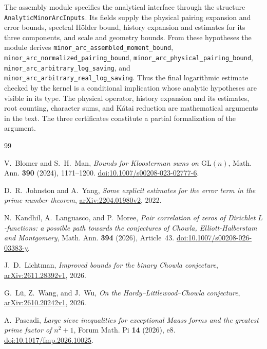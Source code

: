\documentclass[11pt]{amsart}
\numberwithin{equation}{section}
\theoremstyle{remark}
\begin{document}
The assembly module specifies the analytical interface through the
structure \texttt{AnalyticMinorArcInputs}. Its fields supply the
physical pairing expansion and error bounds, spectral H\"older bound,
history expansion and estimates for its three components, and scale and
geometry bounds. From these hypotheses the module derives
\nolinkurl{minor_arc_assembled_moment_bound},
\nolinkurl{minor_arc_normalized_pairing_bound},
\nolinkurl{minor_arc_physical_pairing_bound},
\nolinkurl{minor_arc_arbitrary_log_saving}, and
\nolinkurl{minor_arc_arbitrary_real_log_saving}. Thus the final
logarithmic estimate checked by the kernel is a conditional implication
whose analytic hypotheses are visible in its type. The physical operator,
history expansion and its estimates, root counting, character sums,
and K\'atai reduction are mathematical arguments in the text. The
three certificates constitute a partial formalization of the argument.
\par\endgroup

\begin{thebibliography}{99}

V.~Blomer and S.~H.~Man, \emph{Bounds for Kloosterman sums on $\mathrm{GL}(n)$}, Math. Ann. \textbf{390} (2024), 1171--1200.
\href{https://doi.org/10.1007/s00208-023-02777-6}{doi:10.1007/s00208-023-02777-6}.

D.~R.~Johnston and A.~Yang, \emph{Some explicit estimates for the error term in the prime number theorem}, \href{https://arxiv.org/abs/2204.01980v2}{arXiv:2204.01980v2}, 2022.

N.~Kandhil, A.~Languasco, and P.~Moree, \emph{Pair correlation of zeros of Dirichlet $L$-functions: a possible path towards the conjectures of Chowla, Elliott-Halberstam and Montgomery}, Math. Ann. \textbf{394} (2026), Article~43.
\href{https://doi.org/10.1007/s00208-026-03383-y}{doi:10.1007/s00208-026-03383-y}.

J.~D.~Lichtman, \emph{Improved bounds for the binary Chowla conjecture}, \href{https://arxiv.org/abs/2611.28392v1}{arXiv:2611.28392v1}, 2026.

G.~L\"u, Z.~Wang, and J.~Wu, \emph{On the Hardy--Littlewood--Chowla conjecture}, \href{https://arxiv.org/abs/2610.20242v1}{arXiv:2610.20242v1}, 2026.

A.~Pascadi, \emph{Large sieve inequalities for exceptional Maass forms and the greatest prime factor of $n^2+1$}, Forum Math. Pi \textbf{14} (2026), e8.
\href{https://doi.org/10.1017/fmp.2026.10025}{doi:10.1017/fmp.2026.10025}.

\end{thebibliography}
\end{document}
